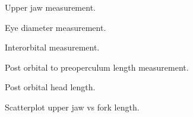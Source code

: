 \documentclass[12pt]{article}\usepackage[]{graphicx}\usepackage[]{color}
\begin{document}
\begin{figure}[htb]

{\centering {} 

}

\caption{Upper jaw measurement.}\label{fig:figure1}
\end{figure}

\begin{figure}[htb]

{\centering {} 

}

\caption{Eye diameter measurement.}\label{fig:figure2}
\end{figure}

\begin{figure}[htb]

{\centering {} 

}

\caption{Interorbital measurement.}\label{fig:figure3}
\end{figure}

\begin{figure}[htb]

{\centering {} 

}

\caption{Post orbital to preoperculum length measurement.}\label{fig:figure4}
\end{figure}

\begin{figure}[htb]

{\centering {} 

}

\caption{Post orbital head length.}\label{fig:figure5}
\end{figure}

\begin{figure}[htb]

{\centering {} 

}

\caption{Scatterplot upper jaw vs fork length.}\label{fig:figure6}
\end{figure}
\end{document}
